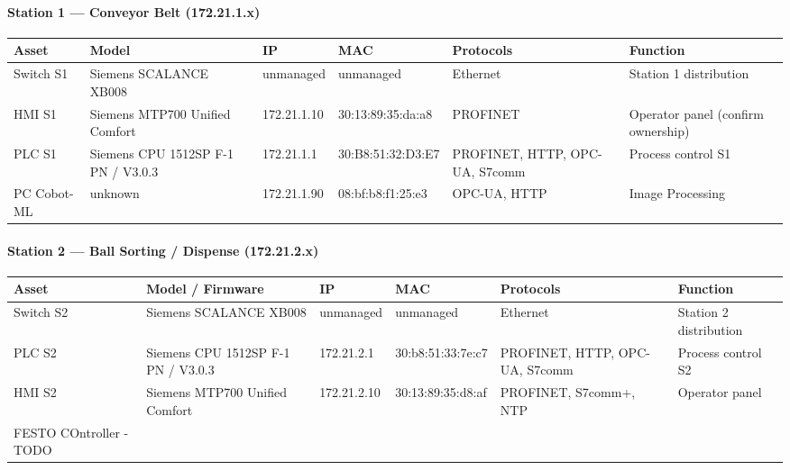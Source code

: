 \documentclass[11pt,a4paper]{article}
\begin{document}
{\paragraph{Station 1 --- Conveyor Belt (172.21.1.x)}
\begin{longtable}{L{2cm} L{2.1cm} L{2.1cm} L{2.6cm} L{2.4cm} L{4cm}}
\toprule
\textbf{Asset} & \textbf{Model} & \textbf{IP} & \textbf{MAC} & \textbf{Protocols} & \textbf{Function} \\
\midrule \endhead
    Switch S1 & Siemens SCALANCE XB008 & unmanaged & unmanaged & Ethernet &
    Station 1 distribution \\

    HMI S1 & Siemens MTP700 Unified Comfort & 172.21.1.10 & 30:13:89:35:da:a8 &
    PROFINET & Operator panel (confirm ownership) \\

    PLC S1 & Siemens CPU 1512SP F-1 PN / V3.0.3 & 172.21.1.1 &
    30:B8:51:32:D3:E7 & PROFINET, HTTP, OPC-UA, S7comm & Process control S1 \\

    PC Cobot-ML & unknown & 172.21.1.90 & 08:bf:b8:f1:25:e3 & OPC-UA, HTTP &
    Image Processing \\
\bottomrule
\end{longtable}

\paragraph{Station 2 --- Ball Sorting / Dispense (172.21.2.x)}
\begin{longtable}{L{2cm} L{2.1cm} L{2.1cm} L{2.6cm} L{2.4cm} L{4cm}}
\toprule
\textbf{Asset} & \textbf{Model / Firmware} & \textbf{IP} & \textbf{MAC} & \textbf{Protocols} & \textbf{Function} \\
\midrule \endhead
    Switch S2 & Siemens SCALANCE XB008 & unmanaged & unmanaged & Ethernet &
    Station 2 distribution \\

    PLC S2 & Siemens CPU 1512SP F-1 PN / V3.0.3 & 172.21.2.1 & 30:b8:51:33:7e:c7 & PROFINET, HTTP, OPC-UA, S7comm & Process control S2 \\

    HMI S2 & Siemens MTP700 Unified Comfort & 172.21.2.10 & 30:13:89:35:d8:af &
    PROFINET, S7comm+, NTP & Operator panel \\

    FESTO COntroller - TODO \\


\end{longtable}}
\end{document}
